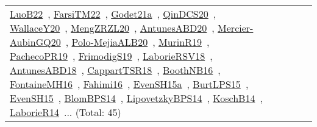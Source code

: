 {\begin{longtable}{lp{3cm}>{\raggedright\arraybackslash}p{6cm}>{\raggedright\arraybackslash}p{6cm}>{\raggedright\arraybackslash}p{8cm}}
\href{../works/LuoB22.pdf}{LuoB22}~\cite{LuoB22}, \href{../works/FarsiTM22.pdf}{FarsiTM22}~\cite{FarsiTM22}, \href{../works/Godet21a.pdf}{Godet21a}~\cite{Godet21a}, \href{../works/QinDCS20.pdf}{QinDCS20}~\cite{QinDCS20}, \href{../works/WallaceY20.pdf}{WallaceY20}~\cite{WallaceY20}, \href{../works/MengZRZL20.pdf}{MengZRZL20}~\cite{MengZRZL20}, \href{../works/AntunesABD20.pdf}{AntunesABD20}~\cite{AntunesABD20}, \href{../works/Mercier-AubinGQ20.pdf}{Mercier-AubinGQ20}~\cite{Mercier-AubinGQ20}, \href{../works/Polo-MejiaALB20.pdf}{Polo-MejiaALB20}~\cite{Polo-MejiaALB20}, \href{../works/MurinR19.pdf}{MurinR19}~\cite{MurinR19}, \href{../works/PachecoPR19.pdf}{PachecoPR19}~\cite{PachecoPR19}, \href{../works/FrimodigS19.pdf}{FrimodigS19}~\cite{FrimodigS19}, \href{../works/LaborieRSV18.pdf}{LaborieRSV18}~\cite{LaborieRSV18}, \href{../works/AntunesABD18.pdf}{AntunesABD18}~\cite{AntunesABD18}, \href{../works/CappartTSR18.pdf}{CappartTSR18}~\cite{CappartTSR18}, \href{../works/BoothNB16.pdf}{BoothNB16}~\cite{BoothNB16}, \href{../works/FontaineMH16.pdf}{FontaineMH16}~\cite{FontaineMH16}, \href{../works/Fahimi16.pdf}{Fahimi16}~\cite{Fahimi16}, \href{../works/EvenSH15a.pdf}{EvenSH15a}~\cite{EvenSH15a}, \href{../works/BurtLPS15.pdf}{BurtLPS15}~\cite{BurtLPS15}, \href{../works/EvenSH15.pdf}{EvenSH15}~\cite{EvenSH15}, \href{../works/BlomBPS14.pdf}{BlomBPS14}~\cite{BlomBPS14}, \href{../works/LipovetzkyBPS14.pdf}{LipovetzkyBPS14}~\cite{LipovetzkyBPS14}, \href{../works/KoschB14.pdf}{KoschB14}~\cite{KoschB14}, \href{../works/LaborieR14.pdf}{LaborieR14}~\cite{LaborieR14}... (Total: 45)\\

\end{longtable}}
